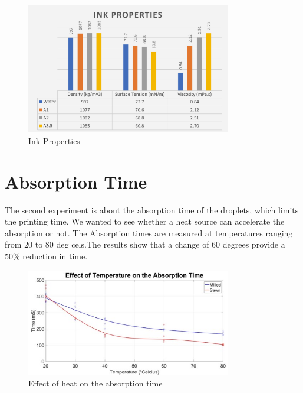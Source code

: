 \begin{figure}[h]
	\centering
	\includegraphics[width=0.8\textwidth]{grafiken/InkProps.jpg}
	\caption{Ink Properties}
	\label{fig:InkProps}
\end{figure} 

\section{Absorption Time}
The second experiment is about the absorption time of the droplets, which limits the printing time. We wanted to see whether a heat source can accelerate the absorption or not.
The Absorption times are measured at temperatures ranging from 20 to 80 deg cels.The results show that a change of 60 degrees provide a 50\% reduction in time.

\begin{figure}[h]
	\centering
	\includegraphics[width=0.8\textwidth]{grafiken/AbsorptionTime.jpg}
	\caption{Effect of heat on the absorption time}
	\label{fig:AbsorptionTime}
\end{figure} 

